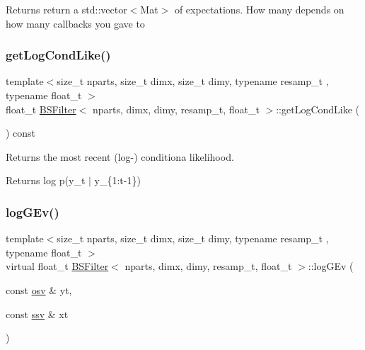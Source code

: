 \begin{DoxyReturn}{Returns}
return a std\+::vector$<$\+Mat$>$ of expectations. How many depends on how many callbacks you gave to 
\end{DoxyReturn}
\mbox{\label{classBSFilter_a6ab6ad2b7b5bd26d8f57af71e560f0a7}} 
\subsubsection{\texorpdfstring{get\+Log\+Cond\+Like()}{getLogCondLike()}}
{\footnotesize\ttfamily template$<$size\+\_\+t nparts, size\+\_\+t dimx, size\+\_\+t dimy, typename resamp\+\_\+t , typename float\+\_\+t $>$ \\
float\+\_\+t \hyperlink{classBSFilter}{B\+S\+Filter}$<$ nparts, dimx, dimy, resamp\+\_\+t, float\+\_\+t $>$\+::get\+Log\+Cond\+Like (\begin{DoxyParamCaption}{ }\end{DoxyParamCaption}) const}



Returns the most recent (log-\/) conditiona likelihood. 

\begin{DoxyReturn}{Returns}
log p(y\+\_\+t $\vert$ y\+\_\+\{1\+:t-\/1\}) 
\end{DoxyReturn}
\mbox{\label{classBSFilter_ae7ef5c414525879235f1e3b72833ced5}} 
\subsubsection{\texorpdfstring{log\+G\+Ev()}{logGEv()}}
{\footnotesize\ttfamily template$<$size\+\_\+t nparts, size\+\_\+t dimx, size\+\_\+t dimy, typename resamp\+\_\+t , typename float\+\_\+t $>$ \\
virtual float\+\_\+t \hyperlink{classBSFilter}{B\+S\+Filter}$<$ nparts, dimx, dimy, resamp\+\_\+t, float\+\_\+t $>$\+::log\+G\+Ev (\begin{DoxyParamCaption}\item[{const \hyperlink{classBSFilter_ad8512328484d7c7bd7a3b7a9481d7f37}{osv} \&}]{yt,  }\item[{const \hyperlink{classBSFilter_a0b5bc93957fb6b6b1282f31fa2e01c3c}{ssv} \&}]{xt }\end{DoxyParamCaption})\hspace{0.3cm}{\ttfamily [pure virtual]}}



